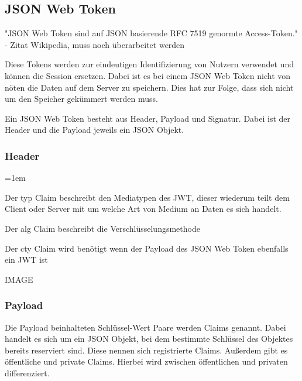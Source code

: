 \documentclass[11pt]{article}
\newcommand{\hlnote}[2]{#1}
\newcommand{\hlnote}[2]{\todo{#2}\texthl{#1}}
\begin{document}
		\subsection{JSON Web Token}
		\label{sec: jwt}
		\begin{flushleft}
			"JSON Web Token sind auf JSON basierende RFC 7519 genormte Access-Token." - Zitat Wikipedia, muss noch überarbeitet werden\par\bigskip

			 Diese Tokens werden zur eindeutigen Identifizierung von Nutzern verwendet und können die Session ersetzen. Dabei ist es bei einem JSON Web Token nicht von nöten die Daten auf dem Server zu speichern. Dies hat zur Folge, dass sich nicht um den Speicher \hlnote{gekümmert werden muss}{ugs}. \par\bigskip

			Ein JSON Web Token besteht aus Header, Payload und Signatur. Dabei ist der Header und die Payload jeweils ein JSON Objekt.

			\subsubsection{Header}
			\label{sec: jwt_header}

			\begin{description}
				\leftskip=1em
				\item[typ] Der typ Claim beschreibt den Mediatypen des JWT, dieser wiederum teilt dem Client oder Server mit um welche Art von Medium an Daten es sich handelt.
				\item[alg] Der alg Claim beschreibt die Verschlüsselungsmethode 
				\item[cty] Der cty Claim wird benötigt wenn der Payload des JSON Web Token ebenfalls ein JWT ist
			\end{description}

			IMAGE

			\subsubsection{Payload}
			\label{sec: jwt_payload}

			Die Payload beinhalteten Schlüssel-Wert Paare werden Claims genannt. Dabei handelt es sich um ein JSON Objekt, bei dem bestimmte Schlüssel des Objektes bereits reserviert sind. Diese nennen sich registrierte Claims. Außerdem gibt es öffentliche und private Claims. Hierbei wird zwischen öffentlichen und privaten differenziert.\par\bigskip



\end{flushleft}
\end{document}
